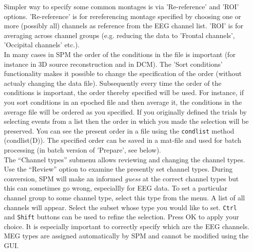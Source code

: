 Simpler way to specify some common montages is via 'Re-reference' and 'ROI' options. 'Re-reference' is for rereferencing montage specified by choosing one or more (possibly all) channels as reference from the EEG channel list. 'ROI' is for averaging across channel groups (e.g. reducing the data to 'Frontal channels', 'Occipital channels' etc.). 
\\
In many cases in SPM the order of the conditions in the file is important (for instance in 3D source reconstruction and in DCM). The 'Sort conditions' functionality makes it possible to change the specification of the order (without actualy changing the data file). Subsequently every time the order of the conditions is important, the order thereby specified will be used. For instance, if you sort conditions in an epoched file and then average it, the conditions in the average file will be ordered as you specified. If you originally defined the trials by selecting events from a list then the order in which you made the selection will be preserved. You can see the present order in a file using the \texttt{condlist} method (condlist(D)). The specified order can be saved in a mat-file and used for batch processing (in batch version of 'Prepare', see below).
\\
The ``Channel types'' submenu allows reviewing and changing the channel types. Use the ``Review'' option to examine the presently set channel types. During conversion, SPM  will make an informed \textit{guess} at the correct channel types but this can sometimes go wrong, especiallly for EEG data. To set a particular channel group to some channel type, select this type from the menu. A list of all channels will appear. Select the subset whose type you would like to set. \texttt{Ctrl} and \texttt{Shift} buttons can be used to refine the selection. Press OK to apply your choice. It is especially important to correctly specify which are the EEG channels. MEG types are assigned automatically by SPM and cannot be modified using the GUI.

